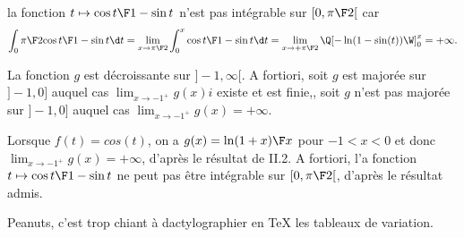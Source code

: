  la fonction $t\mapsto {\cos t\F 1-\sin t}$ n'est pas int\'egrable sur $[0,{\pi\F 2}[$ car 
$$
\int_0{\pi\F2}{\cos t\F 1-\sin t}\d t =\lim_{x\to{\pi\F 2}}\int_0^x{\cos t\F 1-\sin t}\d t=\lim_{x\to + {\pi\F 2}}\Q[-\ln(1-\sin(t))\W]_0^x=+\infty.
$$

 La fonction $g$ est d\'ecroissante sur $]-1,\infty[$. A fortiori, soit $g$ est majorée sur $]-1,0]$ auquel cas $\lim_{x\to-1^+}g(x)i$ existe et est finie,, soit $g$ n'est pas majorée sur $]-1,0]$ auquel cas $\lim_{x\to-1^+}g(x)=+\infty$. 
\medskip

  Lorsque $f(t)=cos(t)$, on a  $g(x)={\ln(1+x)\F x}$ pour $-1<x<0$ et donc $\lim_{x\to-1^+}g(x)=+\infty$, d'après le résultat de II.2. A fortiori, l'a fonction $t\mapsto {\cos t\F 1-\sin t}$ ne peut pas être intégrable sur $[0, {\pi\F 2}[$, d'après le résultat admis. 

 Peanuts, c'est trop chiant à dactylographier en \TeX{} les tableaux de variation.

\bye
